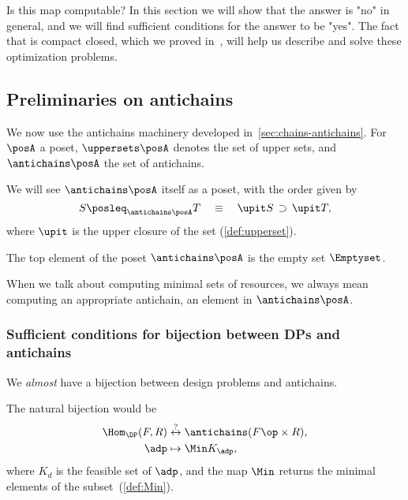 Is this map computable?
In this section we will show that the answer is "no" in general, and we will find sufficient conditions for the answer to be "yes".
The fact that \DP is compact closed, which we proved in~\XXX, will help us describe and solve these optimization problems.

\subsection{Preliminaries on antichains}

We now use the antichains machinery developed in~\cref{sec:chains-antichains}.
For $\posA$ a poset, $\uppersets \posA$ denotes the set of upper sets, and $\antichains \posA$ the set of antichains.


We will see $\antichains \posA$ itself as a poset, with the order given by
\begin{equation*}
    S \posleq_{\antichains \posA} T  \quad \equiv \quad\upit S\, \supset\,\upit T,
\end{equation*}
where $\upit$ is the upper closure of the set (\cref{def:upperset}).

The top element of the poset $\antichains\posA$ is the empty set $\Emptyset$.

When we talk about computing minimal sets of resources, we always mean computing an appropriate antichain, \ie an element in $\antichains \posA$.

\subsubsection{Sufficient conditions for bijection between DPs and antichains}

We \emph{almost} have a bijection between design problems and antichains.

The natural bijection would be
\begin{equation}
    \begin{aligned}
        \Hom_\DP(F,R) & \overset{?
        }{\leftrightarrow} \antichains (F\op \times R), \\
        \adp          & \mapsto \Min K_\adp,
    \end{aligned}
\end{equation}
where $K_d$ is the feasible set of $\adp$,
and the map $\Min$ returns the minimal elements of the subset~(\cref{def:Min}).

